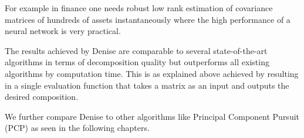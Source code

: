 For example in finance one needs robust low rank estimation of covariance matrices of hundreds of assets instantaneously where the high performance of a neural network is very practical.

The results achieved by Denise are comparable to several state-of-the-art algorithms in terms of decomposition quality but outperforms all existing algorithms by computation time. This is as explained above achieved by resulting in a single evaluation function that takes a matrix as an input and outputs the desired composition.

We further compare Denise to other algorithms like Principal Component Pursuit (PCP) as seen in the following chapters.

\newpage


